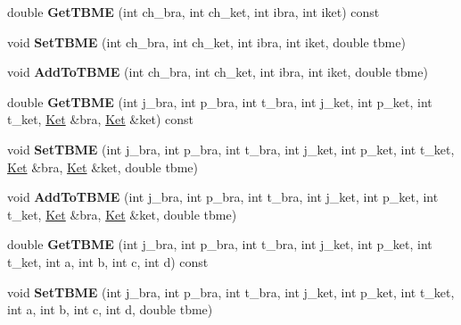 \begin{DoxyCompactItemize}
\item 
\hypertarget{classOperator_a432f18ca70103aed896b396e530d76c4}{double {\bfseries Get\-T\-B\-M\-E} (int ch\-\_\-bra, int ch\-\_\-ket, int ibra, int iket) const }\label{classOperator_a432f18ca70103aed896b396e530d76c4}

\item 
\hypertarget{classOperator_a698798e06b461283bed7a63a163a4373}{void {\bfseries Set\-T\-B\-M\-E} (int ch\-\_\-bra, int ch\-\_\-ket, int ibra, int iket, double tbme)}\label{classOperator_a698798e06b461283bed7a63a163a4373}

\item 
\hypertarget{classOperator_a3f191b350d87a2874ffd5bc9f2809326}{void {\bfseries Add\-To\-T\-B\-M\-E} (int ch\-\_\-bra, int ch\-\_\-ket, int ibra, int iket, double tbme)}\label{classOperator_a3f191b350d87a2874ffd5bc9f2809326}

\item 
\hypertarget{classOperator_a19853c96912ec051d2b55f67e560f68f}{double {\bfseries Get\-T\-B\-M\-E} (int j\-\_\-bra, int p\-\_\-bra, int t\-\_\-bra, int j\-\_\-ket, int p\-\_\-ket, int t\-\_\-ket, \hyperlink{classKet}{Ket} \&bra, \hyperlink{classKet}{Ket} \&ket) const }\label{classOperator_a19853c96912ec051d2b55f67e560f68f}

\item 
\hypertarget{classOperator_a86742776dc2fe3c78d8077cbec0ce522}{void {\bfseries Set\-T\-B\-M\-E} (int j\-\_\-bra, int p\-\_\-bra, int t\-\_\-bra, int j\-\_\-ket, int p\-\_\-ket, int t\-\_\-ket, \hyperlink{classKet}{Ket} \&bra, \hyperlink{classKet}{Ket} \&ket, double tbme)}\label{classOperator_a86742776dc2fe3c78d8077cbec0ce522}

\item 
\hypertarget{classOperator_a864301b26f2b3ed3ca4d0eec952a606d}{void {\bfseries Add\-To\-T\-B\-M\-E} (int j\-\_\-bra, int p\-\_\-bra, int t\-\_\-bra, int j\-\_\-ket, int p\-\_\-ket, int t\-\_\-ket, \hyperlink{classKet}{Ket} \&bra, \hyperlink{classKet}{Ket} \&ket, double tbme)}\label{classOperator_a864301b26f2b3ed3ca4d0eec952a606d}

\item 
\hypertarget{classOperator_a161b7ff96ea0b7c3f0a624ecb4180965}{double {\bfseries Get\-T\-B\-M\-E} (int j\-\_\-bra, int p\-\_\-bra, int t\-\_\-bra, int j\-\_\-ket, int p\-\_\-ket, int t\-\_\-ket, int a, int b, int c, int d) const }\label{classOperator_a161b7ff96ea0b7c3f0a624ecb4180965}

\item 
\hypertarget{classOperator_a9ec3a643ae00c4f18113ef7643c41ecd}{void {\bfseries Set\-T\-B\-M\-E} (int j\-\_\-bra, int p\-\_\-bra, int t\-\_\-bra, int j\-\_\-ket, int p\-\_\-ket, int t\-\_\-ket, int a, int b, int c, int d, double tbme)}\label{classOperator_a9ec3a643ae00c4f18113ef7643c41ecd}


\end{DoxyCompactItemize}
